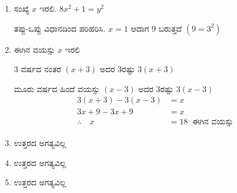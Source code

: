 \begin{enumerate}
\item ಸಂಖ್ಯೆ $x$ ಇರಲಿ. $8x^{2} + 1 = y^{2}$

ತಪ್ಪು-ಒಪ್ಪು ವಿಧಾನದಿಂದ ಪರಿಹರಿಸಿ. $x = 1$ ಆದಾಗ $9$ ಬರುತ್ತದೆ $(9 = 3^{2})$

\item ಈಗಿನ ವಯಸ್ಸು $x$ ಇರಲಿ 

3 ವರ್ಷದ ನಂತರ $(x+3)$ ಅದರ 3ರಷ್ಟು $3(x+3)$ 

ಮೂರು ವರ್ಷದ ಹಿಂದೆ ವಯಸ್ಸು $(x-3)$ ಅದರ 3ರಷ್ಟು $3(x-3)$
\begin{align*}
3(x + 3) -3(x - 3) & = x\\
3x + 9 - 3x + 9 & = x\\
\therefore\quad x & = 18~\text{ ಈಗಿನ ವಯಸ್ಸು}
\end{align*}

\item ಉತ್ತರದ ಅಗತ್ಯವಿಲ್ಲ 

\item ಉತ್ತರದ ಅಗತ್ಯವಿಲ್ಲ 

\item ಉತ್ತರದ ಅಗತ್ಯವಿಲ್ಲ 
\end{enumerate}
